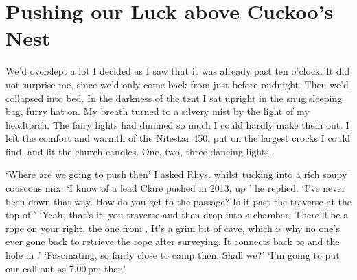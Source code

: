 


\section{Pushing our Luck above Cuckoo's Nest}
    
We'd overslept a lot I decided as I saw that it was already past ten o'clock. It did not surprise me, since we'd only come back from  just before midnight. Then we'd collapsed into bed.
 In the darkness of the tent I sat upright in the snug sleeping bag, furry hat on. My breath turned to a silvery mist by the light of my headtorch. The fairy lights had dimmed so much I could hardly make them out. I left the comfort and warmth of the Nitestar 450, put on the largest crocks I could find, and lit the church candles. One, two, three dancing lights.

`Where are we going to push then' I asked Rhys, whilst tucking into a rich soupy couscous mix.
`I know of a lead Clare pushed in 2013, up ' he replied.
`I've never been down that way. How do you get to the passage? Is it past the traverse at the top of '
`Yeah, that's it, you traverse and then drop into a chamber. There'll be a rope on your right, the one from . It's a grim bit of cave, which is why no one's ever gone back to retrieve the rope after surveying. It connects back to  and the hole in .'
`Fascinating, so fairly close to camp then. Shall we?'
`I'm going to put our call out as 7.00\,pm then'.

